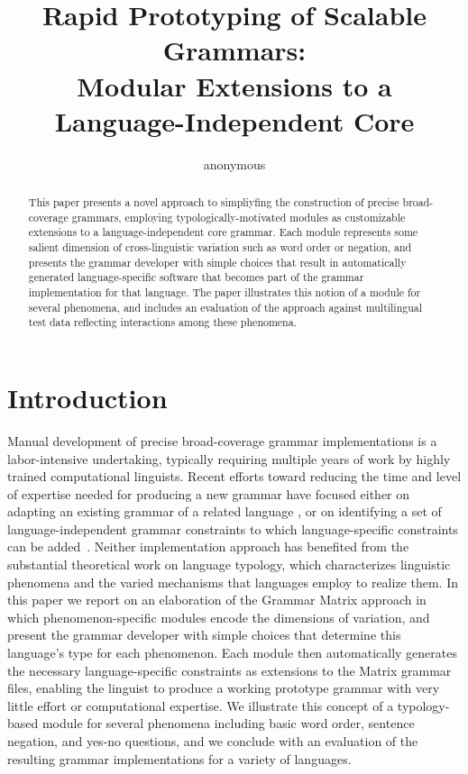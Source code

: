 \documentclass[11pt]{article}
\title{Rapid Prototyping of Scalable Grammars:\\
       Modular Extensions to a Language-Independent Core}
\author{anonymous}
\date{}
\begin{document}
\maketitle
\begin{abstract}
This paper presents a novel approach to simpliyfing the construction of 
precise broad-coverage grammars, employing typologically-motivated modules
as customizable extensions to a language-independent core grammar.  Each
module represents some salient dimension of cross-linguistic variation such
as word order or negation, and presents the grammar developer with simple 
choices that result in automatically generated language-specific software 
that becomes part of the grammar implementation for that language.  The 
paper illustrates this notion of a module for several phenomena, and 
includes an evaluation of the approach against multilingual test data
reflecting interactions among these phenomena.
\end{abstract}

\section{Introduction}
Manual development of precise broad-coverage grammar implementations
is a labor-intensive undertaking, typically requiring multiple years
of work by highly trained computational linguists.  Recent efforts
toward reducing the time and level of expertise needed for producing a
new grammar have focused either on adapting an existing grammar of a
related language \cite{Butt-et-al-02,Kim:Dal:Kap:Kin:Mas:Ohk:03}, or
on identifying a set of language-independent grammar constraints to
which language-specific constraints can be added~\cite{Ben:Fli:Oe:02}.
Neither implementation approach has benefited from the substantial
theoretical work on language typology, which characterizes linguistic
phenomena and the varied mechanisms that languages employ to realize
them.  In this paper we report on an elaboration of the Grammar Matrix
approach in which phenomenon-specific modules encode the dimensions of
variation, and present the grammar developer with simple choices that
determine this language's type for each phenomenon. Each module then
automatically generates the necessary language-specific constraints as
extensions to the Matrix grammar files, enabling the linguist to
produce a working prototype grammar with very little effort or
computational expertise.  We illustrate this concept of a
typology-based module for several phenomena including basic word
order, sentence negation, and yes-no questions, and we conclude with
an evaluation of the resulting grammar implementations for a variety
of languages.
\end{document}
